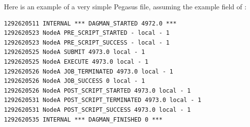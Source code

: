 Here is an example of a very simple Pegasus  file,
assuming the example  field of :

\begin{verbatim}
1292620511 INTERNAL *** DAGMAN_STARTED 4972.0 ***
1292620523 NodeA PRE_SCRIPT_STARTED - local - 1
1292620523 NodeA PRE_SCRIPT_SUCCESS - local - 1
1292620525 NodeA SUBMIT 4973.0 local - 1
1292620525 NodeA EXECUTE 4973.0 local - 1
1292620526 NodeA JOB_TERMINATED 4973.0 local - 1
1292620526 NodeA JOB_SUCCESS 0 local - 1
1292620526 NodeA POST_SCRIPT_STARTED 4973.0 local - 1
1292620531 NodeA POST_SCRIPT_TERMINATED 4973.0 local - 1
1292620531 NodeA POST_SCRIPT_SUCCESS 4973.0 local - 1
1292620535 INTERNAL *** DAGMAN_FINISHED 0 ***
\end{verbatim}



